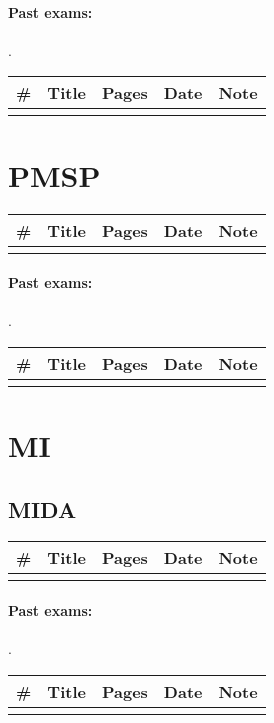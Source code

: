 \documentclass[a4paper,12pt]{article} %
\begin{document}
\paragraph{Past exams:}.\\
\begin{tabularx}{\textwidth}{|l|X|c|l|c|}
	\hline
	\# & Title & Pages & Date & Note \\
	\hline
	&  &  &  &  \\
	\hline
\end{tabularx}

\newpage
\section{PMSP}
\begin{tabularx}{\textwidth}{|l|X|c|l|c|}
	\hline
	\# & Title & Pages & Date & Note \\
	\hline
	&  &  &  &  \\
	\hline
\end{tabularx}

\paragraph{Past exams:}.\\
\begin{tabularx}{\textwidth}{|l|X|c|l|c|}
	\hline
	\# & Title & Pages & Date & Note \\
	\hline
	&  &  &  &  \\
	\hline
\end{tabularx}

\newpage
\section{MI}
\subsection{MIDA}
\begin{tabularx}{\textwidth}{|l|X|c|l|c|}
	\hline
	\# & Title & Pages & Date & Note \\
	\hline
	&  &  &  &  \\
	\hline
\end{tabularx}

\paragraph{Past exams:}.\\
\begin{tabularx}{\textwidth}{|l|X|c|l|c|}
	\hline
	\# & Title & Pages & Date & Note \\
	\hline
	&  &  &  &  \\
	\hline
\end{tabularx}
\end{document}
